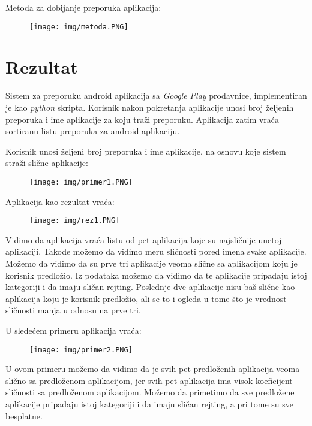 \documentclass[a4paper,12pt,titlepage]{article}
\begin{document}
\newpage
Metoda za dobijanje preporuka aplikacija:
\begin{figure}[ht!]
\centering
\texttt{[image: img/metoda.PNG]}
\label{MetodaCode}
\end{figure}



\section{Rezultat}

Sistem za preporuku android aplikacija sa \emph{Google Play} prodavnice, implementiran je kao \emph{python} skripta. Korisnik nakon pokretanja aplikacije unosi broj željenih preporuka i ime aplikacije za koju traži preporuku. Aplikacija zatim vraća sortiranu listu preporuka za android aplikaciju. 

Korisnik unosi željeni broj preporuka i ime aplikacije, na osnovu koje sistem straži slične aplikacije:
\begin{figure}[ht!]
\centering
\texttt{[image: img/primer1.PNG]}
\label{Input1}
\end{figure}

Aplikacija kao rezultat vraća:
\begin{figure}[ht!]
\centering
\texttt{[image: img/rez1.PNG]}
\label{Input1}
\end{figure}

Vidimo da aplikacija vraća listu od pet aplikacija koje su najsličnije unetoj aplikaciji. Takođe možemo da vidimo meru sličnosti pored imena svake aplikacije. Možemo da vidimo da su prve tri aplikacije veoma slične sa aplikacijom koju je korisnik predložio. Iz podataka možemo da vidimo da te aplikacije pripadaju istoj kategoriji i da imaju sličan rejting. Poslednje dve aplikacije nisu baš slične kao aplikacija koju je korisnik predložio, ali se to i ogleda u tome što je vrednost sličnosti manja u odnosu na prve tri.

\newpage
U sledećem primeru aplikacija vraća:

\begin{figure}[ht!]
\centering
\texttt{[image: img/primer2.PNG]}
\label{Input1}
\end{figure}

U ovom primeru možemo da vidimo da je svih pet predloženih aplikacija veoma slično sa predloženom aplikacijom, jer svih pet aplikacija ima visok koeficijent sličnosti sa predloženom aplikacijom. Možemo da primetimo da sve predložene aplikacije pripadaju istoj kategoriji i da imaju sličan rejting, a pri tome su sve besplatne.
\end{document}
